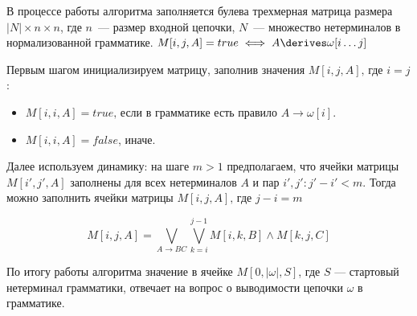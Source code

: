 В процессе работы алгоритма заполняется булева трехмерная матрица размера $|N| \times n \times n$, где $n$~---  размер входной цепочки, $N$~--- множество нетерминалов в нормализованной грамматике.
$M[i, j, A] = true \iff A \derives \omega[i \dots j]$

Первым шагом инициализируем матрицу, заполнив значения $M[i, j, A] \text{, где }i = j$:

\begin{itemize}
  \item $M[i, i, A] = true \text{, если в грамматике есть правило } A \to \omega[i]$.
  \item $M[i, i, A] = false$, иначе.
\end{itemize}

Далее используем динамику: на шаге $m > 1$ предполагаем, что ячейки матрицы $M[i', j', A]$ заполнены для всех нетерминалов $A$ и пар $i', j': j' - i' < m$.
Тогда можно заполнить ячейки матрицы $M[i, j, A] \text{, где } j - i = m$

\[ M[i, j, A] = \bigvee_{A \to B C}^{}{\bigvee_{k=i}^{j-1}{M[i, k, B] \wedge M[k, j, C]}} \]

По итогу работы алгоритма значение в ячейке $M[0, |\omega|, S]$, где $S$ --- стартовый нетерминал грамматики, отвечает на вопрос о выводимости цепочки $\omega$ в грамматике.

